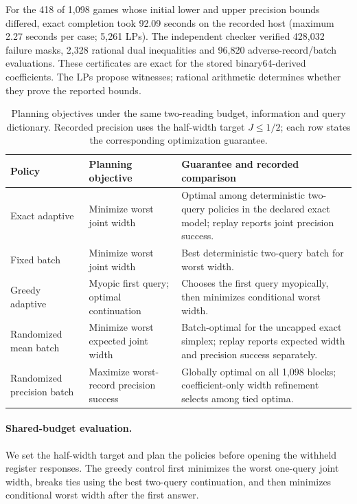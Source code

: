 \documentclass[12pt]{article}
\begin{document}
For the 418 of 1,098 games whose initial lower and upper precision bounds
differed, exact completion took 92.09 seconds on the recorded host (maximum 2.27 seconds per case; 5,261 LPs). The independent
checker verified 428,032 failure masks, 2,328 rational dual inequalities
and 96,820 adverse-record/batch evaluations. These certificates are exact
for the stored binary64-derived coefficients. The LPs propose witnesses;
rational arithmetic determines whether they prove the reported bounds.
\begin{table}[htbp]
\centering\small
\begin{tabular}{>{\raggedright\arraybackslash}p{.19\linewidth}>{\raggedright\arraybackslash}p{.25\linewidth}>{\raggedright\arraybackslash}p{.45\linewidth}}
\toprule
Policy & Planning objective & Guarantee and recorded comparison\\
\midrule
Exact adaptive & Minimize worst joint width & Optimal among deterministic two-query policies in the declared exact model; replay reports joint precision success.\\
Fixed batch & Minimize worst joint width & Best deterministic two-query batch for worst width.\\
Greedy adaptive & Myopic first query; optimal continuation & Chooses the first query myopically, then minimizes conditional worst width.\\
Randomized mean batch & Minimize worst expected joint width & Batch-optimal for the uncapped exact simplex; replay reports expected width and precision success separately.\\
Randomized precision batch & Maximize worst-record precision success & Globally optimal on all 1,098 blocks; coefficient-only width refinement selects among tied optima.\\
\bottomrule
\end{tabular}
\caption{Planning objectives under the same two-reading budget, information and query dictionary. Recorded precision uses the half-width target $J\leq1/2$; each row states the corresponding optimization guarantee.}
\label{tab:joint_objectives}
\end{table}

\paragraph{Shared-budget evaluation.}
We set the half-width target and plan the policies before opening the
withheld register responses.
The greedy control first minimizes the worst one-query joint width, breaks
ties using the best two-query continuation, and then minimizes conditional
worst width after the first answer.
\end{document}
